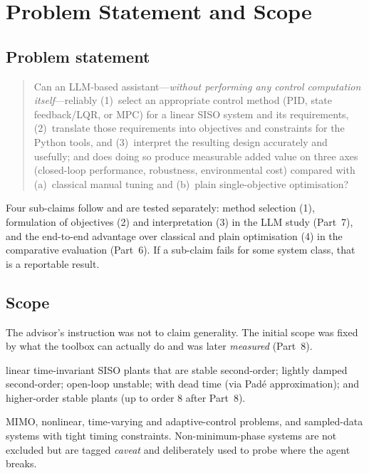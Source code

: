 \documentclass[a4paper,11pt]{article}
\begin{document}
\section{Problem Statement and Scope}
\subsection{Problem statement}
\begin{quote}
Can an LLM-based assistant---\emph{without performing any control computation itself}---reliably (1)~select an appropriate control method (PID, state feedback/LQR, or MPC) for a linear SISO system and its requirements, (2)~translate those requirements into objectives and constraints for the Python tools, and (3)~interpret the resulting design accurately and usefully; and does doing so produce measurable added value on three axes (closed-loop performance, robustness, environmental cost) compared with (a)~classical manual tuning and (b)~plain single-objective optimisation?
\end{quote}
Four sub-claims follow and are tested separately: method selection (1), formulation of objectives (2) and interpretation (3) in the LLM study (Part~7), and the end-to-end advantage over classical and plain optimisation (4) in the comparative evaluation (Part~6). If a sub-claim fails for some system class, that is a reportable result.

\subsection{Scope}
The advisor's instruction was not to claim generality. The initial scope was fixed by what the toolbox can actually do and was later \emph{measured} (Part~8).
\begin{description}[leftmargin=1.2em,style=nextline]
\item[In scope (claimed, to be tested):] linear time-invariant SISO plants that are stable second-order; lightly damped second-order; open-loop unstable; with dead time (via Pad\'e approximation); and higher-order stable plants (up to order 8 after Part~8).
\item[Out of scope (refused by the agent):] MIMO, nonlinear, time-varying and adaptive-control problems, and sampled-data systems with tight timing constraints. Non-minimum-phase systems are not excluded but are tagged \emph{caveat} and deliberately used to probe where the agent breaks.
\end{description}
\end{document}
